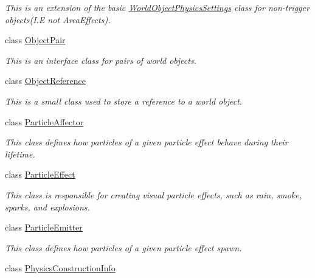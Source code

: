\begin{DoxyCompactItemize}
\begin{DoxyCompactList}\small\item\em This is an extension of the basic \hyperlink{classMezzanine_1_1WorldObjectPhysicsSettings}{WorldObjectPhysicsSettings} class for non-\/trigger objects(I.E not AreaEffects). \item\end{DoxyCompactList}\item 
class \hyperlink{classMezzanine_1_1ObjectPair}{ObjectPair}
\begin{DoxyCompactList}\small\item\em This is an interface class for pairs of world objects. \item\end{DoxyCompactList}\item 
class \hyperlink{classMezzanine_1_1ObjectReference}{ObjectReference}
\begin{DoxyCompactList}\small\item\em This is a small class used to store a reference to a world object. \item\end{DoxyCompactList}\item 
class \hyperlink{classMezzanine_1_1ParticleAffector}{ParticleAffector}
\begin{DoxyCompactList}\small\item\em This class defines how particles of a given particle effect behave during their lifetime. \item\end{DoxyCompactList}\item 
class \hyperlink{classMezzanine_1_1ParticleEffect}{ParticleEffect}
\begin{DoxyCompactList}\small\item\em This class is responsible for creating visual particle effects, such as rain, smoke, sparks, and explosions. \item\end{DoxyCompactList}\item 
class \hyperlink{classMezzanine_1_1ParticleEmitter}{ParticleEmitter}
\begin{DoxyCompactList}\small\item\em This class defines how particles of a given particle effect spawn. \item\end{DoxyCompactList}\item 
class \hyperlink{classMezzanine_1_1PhysicsConstructionInfo}{PhysicsConstructionInfo}

\end{DoxyCompactItemize}
